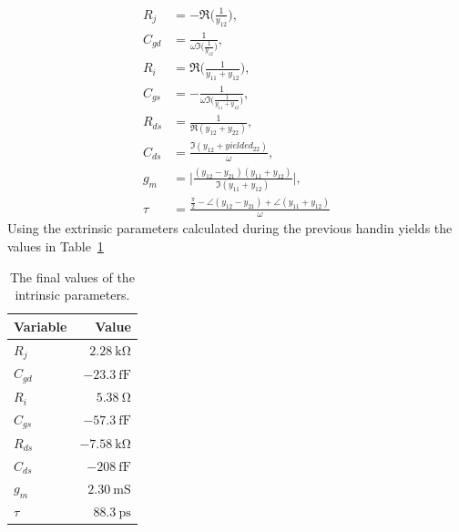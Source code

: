 \documentclass[12pt,a4paper]{article}
\begin{document}
\begin{subequations}
  \label{eq:in_param_solve}
  \begin{align}
    R_j &= -\Re\Big(\frac{1}{y_{12}}\Big), \label{eq:in_param_solve_rj}\\
    C_{gd} &= \frac{1}{\omega\Im\big(\frac{1}{y_{12}}\big)}, \label{eq:in_param_solve_cgd}\\
    R_i &= \Re\Big(\frac{1}{y_{11}+y_{12}}\Big), \label{eq:in_param_solve_ri}\\
    C_{gs} &= -\frac{1}{\omega\Im\big(\frac{1}{y_{11}+y_{12}}\big)}, \label{eq:in_param_solve_cgs}\\
    R_{ds} &= \frac{1}{\Re(y_{12}+y_{22})}, \label{eq:in_param_solve_rds}\\
    C_{ds} &= \frac{\Im(y_{12}+yielded_{22})}{\omega}, \label{eq:in_param_solve_cds}\\
    g_m &= \Bigg|\frac{(y_{12}-y_{21})(y_{11}+y_{12})}{\Im(y_{11}+y_{12})}\Bigg|, \label{eq:in_param_solve_gm}\\
    \tau &= \frac{\frac{\pi}{2}-\angle(y_{12}-y_{21})+\angle(y_{11}+y_{12})}{\omega} \label{eq:in_param_solve_tau}
  \end{align}
\end{subequations}
Using the extrinsic parameters calculated during the previous handin yields the values in Table~\ref{tab:in_vals}
\begin{table}
  \centering
  \begin{tabular}{|l|r|}\hline
    Variable & Value \\ \hline
    $R_j$ & $\SI{2.28}{\kilo\ohm}$ \\
    $C_{gd}$ & $\SI{-23.3}{\femto\farad}$ \\
    $R_i$ & $\SI{5.38}{\ohm}$ \\
    $C_{gs}$ & $\SI{-57.3}{\femto\farad}$ \\
    $R_{ds}$ & $\SI{-7.58}{\kilo\ohm}$ \\
    $C_{ds}$ & $\SI{-208}{\femto\farad}$ \\
    $g_m$ & $\SI{2.30}{\milli\siemens}$ \\
    $\tau$ & $\SI{88.3}{\pico\second}$ \\ \hline
  \end{tabular}
  \caption{The final values of the intrinsic parameters.}
  \label{tab:in_vals}
\end{table}
\end{document}
